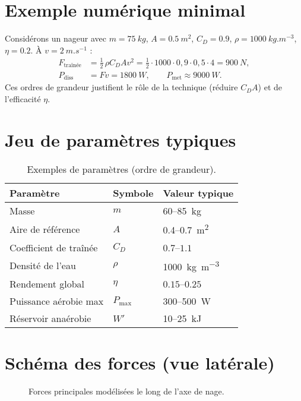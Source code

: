 \documentclass[12pt,a4paper]{article}
\begin{document}
\section{Exemple numérique minimal}
Considérons un nageur avec $m=\SI{75}{kg}$, $A=\SI{0.5}{m^2}$, $C_D=0.9$, $\rho=\SI{1000}{kg.m^{-3}}$, $\eta=0.2$. À $v=\SI{2}{m.s^{-1}}$ :
\begin{align}
 F_{\mathrm{traînée}} &= \tfrac{1}{2}\,\rho C_D A v^2 = \tfrac{1}{2}\cdot1000\cdot0{,}9\cdot0{,}5\cdot 4 = \SI{900}{N}, \\
 P_{\mathrm{diss}} &= Fv = \SI{1800}{W}, \qquad P_{\mathrm{met}} \approx \SI{9000}{W}.
 \end{align}
Ces ordres de grandeur justifient le rôle de la technique (réduire $C_D A$) et de l'efficacité $\eta$.

\section{Jeu de paramètres typiques}
\begin{table}[h]
 \centering
 \caption{Exemples de paramètres (ordre de grandeur).}
 \label{tab:param}
 \begin{tabular}{@{}lll@{}}
  \toprule
  Paramètre & Symbole & Valeur typique \\
  \midrule
  Masse & $m$ & \SI{60}{}--\SI{85}{kg} \\
  Aire de référence & $A$ & \SI{0.4}{}--\SI{0.7}{m^2} \\
  Coefficient de traînée & $C_D$ & $0.7$--$1.1$ \\
  Densité de l'eau & $\rho$ & \SI{1000}{kg.m^{-3}} \\
  Rendement global & $\eta$ & $0.15$--$0.25$ \\
  Puissance aérobie max & $P_{\max}$ & \SI{300}{}--\SI{500}{W} \\
  Réservoir anaérobie & $W'$ & \SI{10}{}--\SI{25}{kJ} \\
  \bottomrule
 \end{tabular}
\end{table}

\section{Schéma des forces (vue latérale)}
\begin{figure}[h]
 \centering
 \caption{Forces principales modélisées le long de l'axe de nage.}
\end{figure}
\end{document}
